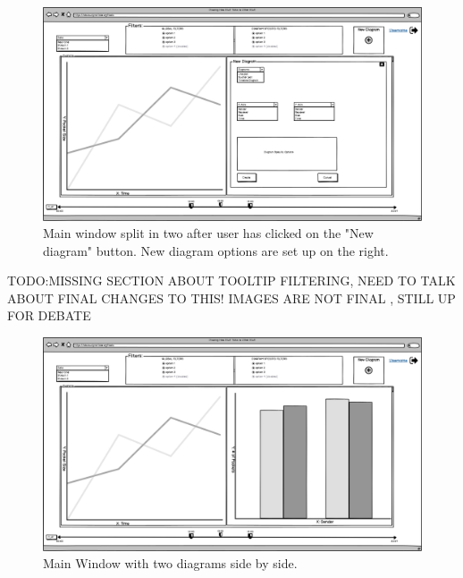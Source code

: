 \documentclass[twoside, english, draft]{Pflichtenheft}
\begin{document}
\vfill

\begin{figure}[h]
\centering
\includegraphics[width=\textwidth]{Images/03MW.png}
	\caption{Main window split in two after user has clicked on the "New diagram" button. New diagram options are set up on the right.}
	\label{fig:mainWindow1}
\end{figure}


\vfill
\clearpage

TODO:MISSING SECTION ABOUT TOOLTIP FILTERING, NEED TO TALK ABOUT FINAL CHANGES TO THIS!
IMAGES ARE NOT FINAL , STILL UP FOR DEBATE

\begin{figure}[h]
\centering
\label{fig:mainWindow2}
\includegraphics[width=\textwidth]{Images/04MW.png}
	\caption{Main Window with two diagrams side by side.}
		\label{fig:mainWindow2}
\end{figure}
\end{document}
